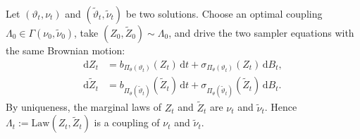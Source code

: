 Let \((\vartheta_t,\nu_t)\) and \((\tilde\vartheta_t,\tilde\nu_t)\) be two solutions. Choose an optimal coupling \(\Lambda_0\in\Gamma(\nu_0,\tilde\nu_0)\), take \((Z_0,\tilde Z_0)\sim\Lambda_0\), and drive the two sampler equations with the same Brownian motion:
\begin{align*}
    \mathrm dZ_t
    &=
    b_{\Pi_\theta(\vartheta_t)}(Z_t)\,\mathrm dt
    +
    \sigma_{\Pi_\theta(\vartheta_t)}(Z_t)\,\mathrm dB_t,\\
    \mathrm d\tilde Z_t
    &=
    b_{\Pi_\theta(\tilde\vartheta_t)}(\tilde Z_t)\,\mathrm dt
    +
    \sigma_{\Pi_\theta(\tilde\vartheta_t)}(\tilde Z_t)\,\mathrm dB_t.
\end{align*}
By uniqueness, the marginal laws of \(Z_t\) and \(\tilde Z_t\) are \(\nu_t\) and \(\tilde\nu_t\). Hence \(\Lambda_t:=\mathrm{Law}(Z_t,\tilde Z_t)\) is a coupling of \(\nu_t\) and \(\tilde\nu_t\).

